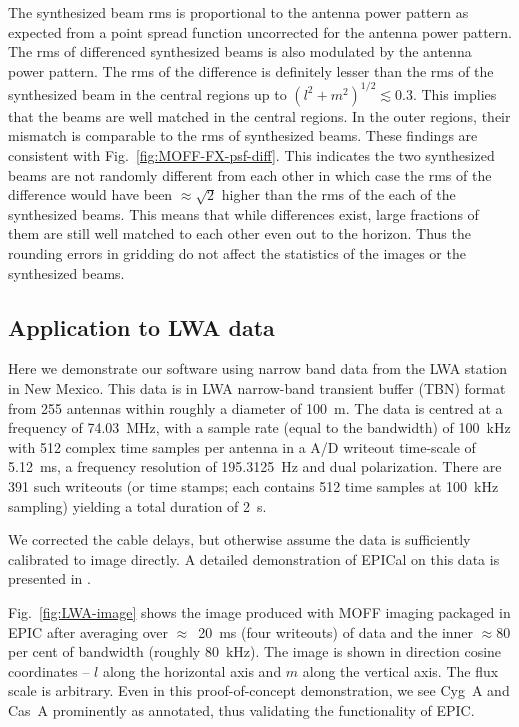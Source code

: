 \documentclass[a4paper,fleqn,usenatbib]{mnras}
\begin{document}
The synthesized beam rms is proportional to the antenna power pattern as 
expected from a point spread function uncorrected for the antenna power pattern. 
The rms of differenced synthesized beams is also modulated by the antenna power 
pattern. The rms of the difference is definitely lesser than the rms of the 
synthesized beam in the central regions up to $(l^2+m^2)^{1/2}\lesssim 0.3$. This 
implies that the beams are well matched in the central regions. In the outer 
regions, their mismatch is comparable to the rms of synthesized beams. These findings are consistent with Fig.~\ref{fig:MOFF-FX-psf-diff}. This 
indicates the two synthesized beams are not randomly different from 
each other in which case the rms of the difference would have been 
$\approx \sqrt{2}$ higher than the rms of the each of the synthesized beams. 
This means that while differences exist, large fractions of them are still 
well matched to each other even out to the horizon. Thus the rounding errors in 
gridding do not affect the statistics of the images or the synthesized beams.

\subsection{Application to LWA data}\label{sec:LWA-data}

Here we demonstrate our software using narrow band data from the LWA station 
in New Mexico. This data is in LWA narrow-band transient buffer (TBN) format 
from 255 antennas within roughly a diameter of 100~m. The data is centred at a 
frequency of 74.03~MHz, with a sample rate (equal to the bandwidth) of 100~kHz 
with 512 complex time samples per antenna in a A/D writeout time-scale of 
5.12~ms, a frequency resolution of 195.3125~Hz and dual polarization. There are 
391 such writeouts (or time stamps; each contains 512 time samples at 100~kHz 
sampling) yielding a total duration of 2~s. 

We corrected the cable delays, but otherwise assume the data is sufficiently calibrated to image directly. A detailed demonstration of EPICal on this data is presented in \citet{bea16}.

Fig.~\ref{fig:LWA-image} shows the image produced with MOFF imaging 
packaged in EPIC after averaging over $\approx$~20~ms (four writeouts) of data 
and the inner $\approx 80$ per cent of bandwidth (roughly 80~kHz). The image is 
shown in direction cosine coordinates -- $l$ along the horizontal axis and $m$ 
along the vertical axis. The flux scale is arbitrary. Even in this 
proof-of-concept demonstration, we see Cyg~A and Cas~A prominently as annotated, 
thus validating the functionality of EPIC.
\end{document}
